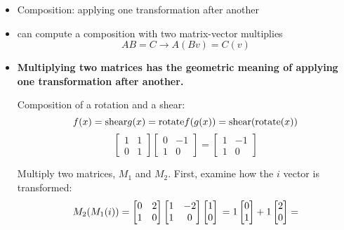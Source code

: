 \begin{itemize}
    \item Composition: applying one transformation after another
    \item can compute a composition with two matrix-vector multiplies
    $$ AB = C \rightarrow A(Bv) = C(v) $$
    \item \textbf{Multiplying two matrices has the geometric meaning of applying one transformation after another.}
    \begin{example}
        Composition of a rotation and a shear:
        $$ f(x) = \text{shear} \\
        g(x) = \text{rotate} \\
        f(g(x)) = \text{shear}(\text{rotate}(x)) $$
        $$ \begin{bmatrix}
        1 & 1 \\
        0 & 1 
        \end{bmatrix}
        \begin{bmatrix}
        0 & -1 \\
        1 & 0 
        \end{bmatrix}
        = \begin{bmatrix}
        1 & -1 \\
        1 & 0
        \end{bmatrix} $$
    \end{example}
    \begin{example}
        Multiply two matrices, $M_1$ and $M_2$. First, examine how the $i$ vector is transformed:
        $$ M_2(M_1(i)) = \begin{bmatrix}
        0 & 2 \\
        1 & 0 
        \end{bmatrix}
        \begin{bmatrix}
        1 & -2 \\
        1 & 0 
        \end{bmatrix}
        \begin{bmatrix}
        1 \\
        0 
        \end{bmatrix} \newline
        = 1 \begin{bmatrix}
        0 \\
        1 
        \end{bmatrix} +
        1 \begin{bmatrix}
        2 \\
        0
        \end{bmatrix} =
$$
\end{example}
\end{itemize}
